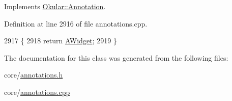 Implements \hyperlink{classOkular_1_1Annotation_af9833449767eacd740f377e69a1fdd48}{Okular\+::\+Annotation}.



Definition at line 2916 of file annotations.\+cpp.


\begin{DoxyCode}
2917 \{
2918     \textcolor{keywordflow}{return} \hyperlink{classOkular_1_1Annotation_af71b46e37d5f850b97d5c4de3be9aac0aa0f6a560b971fe69d18156176258d6c8}{AWidget};
2919 \}
\end{DoxyCode}


The documentation for this class was generated from the following files\+:\begin{DoxyCompactItemize}
\item 
core/\hyperlink{annotations_8h}{annotations.\+h}\item 
core/\hyperlink{annotations_8cpp}{annotations.\+cpp}\end{DoxyCompactItemize}
